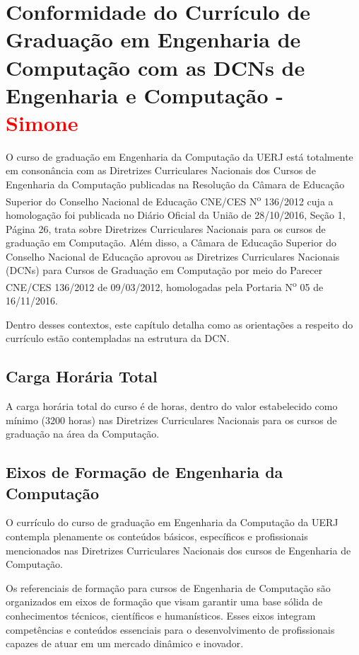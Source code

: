 \chapter{Conformidade do Currículo de Graduação em Engenharia de Computação
  com as DCNs de Engenharia e Computação - \textcolor{red}{Simone}}


O curso de graduação em Engenharia da Computação da UERJ está totalmente em
consonância com as Diretrizes Curriculares Nacionais dos Cursos de Engenharia da Computação publicadas na Resolução da Câmara de Educação Superior do Conselho Nacional de Educação   CNE/CES N\textsuperscript{o}  136/2012 cuja a homologação foi publicada no Diário Oficial da União de 28/10/2016, Seção 1, Página 26, trata sobre Diretrizes Curriculares Nacionais para os cursos de graduação em Computação. Além disso, a Câmara de Educação Superior do Conselho Nacional de Educação aprovou as Diretrizes Curriculares Nacionais (DCNs) para Cursos
de Graduação em Computação por meio do Parecer CNE/CES 136/2012 de 09/03/2012, homologadas pela Portaria N\textsuperscript{o} 05 de 16/11/2016.

Dentro desses contextos, este capítulo detalha como as orientações a respeito do currículo estão contempladas na estrutura da DCN.


\section{Carga Horária Total}

A carga horária total do curso é de \totalHorasCurso horas, dentro do valor estabelecido como mínimo (3200 horas) nas Diretrizes Curriculares Nacionais para os cursos de graduação na área da Computação.


\section{Eixos de Formação de Engenharia da Computação}

O currículo do curso de graduação em Engenharia da Computação da UERJ contempla plenamente os conteúdos básicos, específicos e profissionais mencionados nas Diretrizes Curriculares Nacionais dos cursos de Engenharia de Computação.

Os referenciais de formação para cursos de Engenharia de Computação são organizados em eixos de formação que visam garantir uma base sólida de conhecimentos técnicos, científicos e humanísticos. Esses eixos integram competências e conteúdos essenciais para o desenvolvimento de profissionais capazes de atuar em um mercado dinâmico e inovador.


